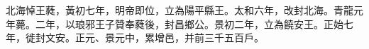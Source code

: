 
\begin{pinyinscope}
北海悼王蕤，黃初七年，明帝即位，立為陽平縣王。太和六年，改封北海。青龍元年薨。二年，以琅邪王子贊奉蕤後，封昌鄉公。景初二年，立為饒安王。正始七年，徙封文安。正元、景元中，累增邑，并前三千五百戶。


\end{pinyinscope}